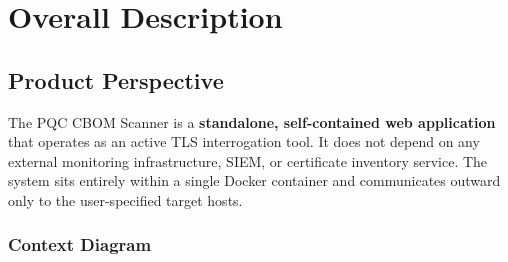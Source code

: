 \chapter{Overall Description}
\label{chap:overall_desc}

\section{Product Perspective}
\label{sec:product_perspective}

The PQC CBOM Scanner is a \textbf{standalone, self-contained web application} that
operates as an active TLS interrogation tool. It does not depend on any external
monitoring infrastructure, SIEM, or certificate inventory service. The system sits
entirely within a single Docker container and communicates outward only to the
user-specified target hosts.

\subsection{Context Diagram}

